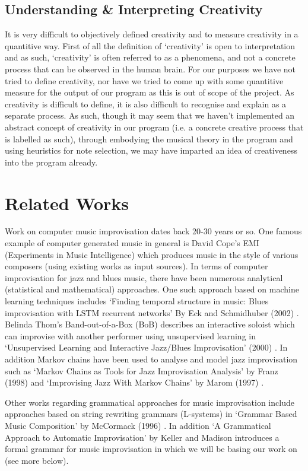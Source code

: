 \documentclass[pdftex,12pt,a4paper]{report}
\begin{document}
\subsection{Understanding \& Interpreting Creativity}
It is very difficult to objectively defined creativity and to measure creativity in a quantitive way. First of all the definition of `creativity' is open to interpretation and as such, `creativity' is often referred to as a phenomena, and not a concrete process that can be observed in the human brain. For our purposes we have not tried to define creativity, nor have we tried to come up with some quantitive measure for the output of our program as this is out of scope of the project. As creativity is difficult to define, it is also difficult to recognise and explain as a separate process. As such, though it may seem that we haven't implemented an abstract concept of creativity in our program (i.e. a concrete creative process that is labelled as such), through embodying the musical theory in the program and using heuristics for note selection, we may have imparted an idea of creativeness into the program already. 

\section{Related Works}
Work on computer music improvisation dates back 20-30 years or so. One famous example of computer generated music in general is David Cope's EMI (Experiments in Music Intelligence) which produces music in the style of various composers (using existing works as input sources). In terms of computer improvisation for jazz and blues music, there have been numerous analytical (statistical and mathematical) approaches. One such approach based on machine learning techniques includes `Finding temporal structure in music: Blues improvisation with LSTM recurrent networks' By Eck and Schmidhuber (2002) \cite{eck02}. Belinda Thom's Band-out-of-a-Box (BoB) describes an interactive soloist which can improvise with another performer using unsupervised learning in `Unsupervised Learning and Interactive Jazz/Blues Improvisation' (2000) \cite{thom2000}. In addition Markov chains have been used to analyse and model jazz improvisation such as `Markov Chains as Tools for Jazz Improvisation Analysis' by Franz (1998) \cite{franz98} and `Improvising Jazz With Markov Chains' by Marom (1997) \cite{marom97}.

Other works regarding grammatical approaches for music improvisation include approaches based on string rewriting grammars (L-systems) in `Grammar Based Music Composition' by McCormack (1996) \cite{mccormack96}. In addition `A Grammatical Approach to Automatic Improvisation' by Keller and Madison \cite{keller07} introduces a formal grammar for music improvisation in which we will be basing our work on (see more below).
\end{document}
